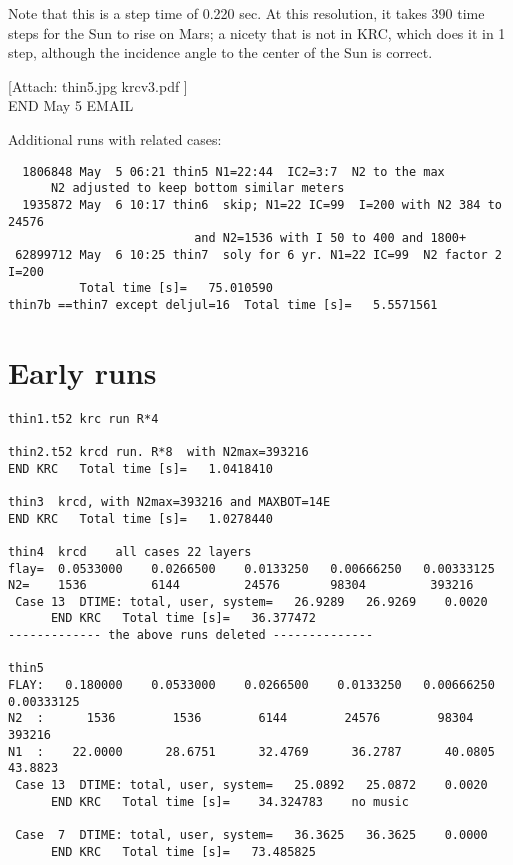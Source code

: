 \documentclass{article}  %
\begin{document}
Note that this is a step time of 0.220 sec. At this resolution, it takes 390
time steps for the Sun to rise on Mars; a nicety that is not in KRC, which does
it in 1 step, although the incidence angle to the center of the Sun is correct.

[Attach:  thin5.jpg  krcv3.pdf ]
\\ END May 5 EMAIL

Additional runs with related cases:
\vspace{-3.mm} 
\begin{verbatim}
  1806848 May  5 06:21 thin5 N1=22:44  IC2=3:7  N2 to the max
      N2 adjusted to keep bottom similar meters
  1935872 May  6 10:17 thin6  skip; N1=22 IC=99  I=200 with N2 384 to 24576 
                          and N2=1536 with I 50 to 400 and 1800+
 62899712 May  6 10:25 thin7  soly for 6 yr. N1=22 IC=99  N2 factor 2 I=200
          Total time [s]=   75.010590
thin7b ==thin7 except deljul=16  Total time [s]=   5.5571561
\end{verbatim} 

\section{Early runs}
\vspace{-3.mm} 
\begin{verbatim}
thin1.t52 krc run R*4

thin2.t52 krcd run. R*8  with N2max=393216
END KRC   Total time [s]=   1.0418410 

thin3  krcd, with N2max=393216 and MAXBOT=14E
END KRC   Total time [s]=   1.0278440 

thin4  krcd    all cases 22 layers
flay=  0.0533000    0.0266500    0.0133250   0.00666250   0.00333125
N2=    1536         6144         24576       98304         393216
 Case 13  DTIME: total, user, system=   26.9289   26.9269    0.0020
      END KRC   Total time [s]=   36.377472 
------------- the above runs deleted -------------- 

thin5
FLAY:   0.180000    0.0533000    0.0266500    0.0133250   0.00666250   0.00333125
N2  :      1536        1536        6144        24576        98304       393216
N1  :    22.0000      28.6751      32.4769      36.2787      40.0805      43.8823
 Case 13  DTIME: total, user, system=   25.0892   25.0872    0.0020
      END KRC   Total time [s]=    34.324783    no music 

 Case  7  DTIME: total, user, system=   36.3625   36.3625    0.0000
      END KRC   Total time [s]=   73.485825    

\end{verbatim} 
 
\end{document}
